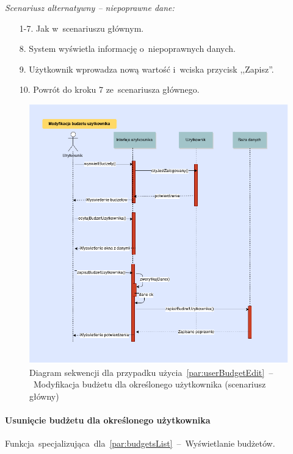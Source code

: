 \noindent \textit{Scenariusz alternatywny -- niepoprawne dane:}
\begin{enumerate}
  \item[1-7.] Jak w~scenariuszu głównym.
  \item[8.] System wyświetla informację o~niepoprawnych danych.
  \item[9.] Użytkownik wprowadza nową wartość i~wciska przycisk ,,Zapisz''.
  \item[10.] Powrót do kroku 7 ze~scenariusza głównego.
\end{enumerate}

\begin{figure}[H]
  \includegraphics[width=\textwidth]{images/modyfikacja_budzetu_uzytkownika.png}
  \caption{Diagram sekwencji dla przypadku użycia~\ref{par:userBudgetEdit}~--~Modyfikacja budżetu dla określonego użytkownika (scenariusz główny)}
\end{figure}

\paragraph{Usunięcie budżetu dla określonego użytkownika\newline}
\label{par:userBudgetDelete}
Funkcja~specjalizująca~dla~\ref{par:budgetsList}~--~Wyświetlanie budżetów.\\


